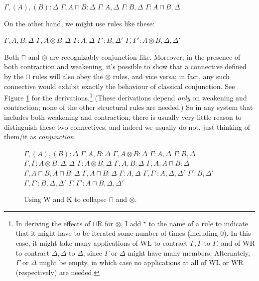 \documentclass{ergoclass}
\def\fCenter{:}
\newcommand{\mand}{\ensuremath{\otimes}}
\newcommand{\aand}{\ensuremath{\sqcap}}
\newcommand{\D}{\Delta}
\newcommand{\G}{\Gamma}
\newcommand{\hs}{\hskip 5mm}
\newcommand{\vs}{\vskip 5mm}
\newcommand{\BIx}[2]{\BinaryInf$ #1 \fCenter #2$}
\newcommand{\UIx}[2]{\UnaryInf$ #1 \fCenter #2$}
\newcommand{\AXx}[2]{\Axiom$ #1 \fCenter #2$}
\newcommand{\LLl}[1]{\LeftLabel{\scriptsize #1:\quad}}
\begin{document}
\medskip
{\centering
\AXx{\G, (A), (B)}{\D}
\LLl{$\aand$L}
\UIx{\G, A \aand B}{\D}
\DP
\hs
\AXx{\G}{A, \D}
\AXx{\G}{B, \D}
\LLl{$\aand$R}
\BIx{\G}{A \aand B, \D}
\DP

}
\medskip

\noindent On the other hand, we might use rules like these:


\medskip
{\centering
\AXx{\G, A, B}{\D}
\LLl{$\mand$L}
\UIx{\G, A \mand B}{\D}
\DP
\hs
\AXx{\G}{A, \D}
\AXx{\G'}{B, \D'}
\LLl{$\mand$R}
\BIx{\G, \G'}{A \mand B, \D, \D'}
\DP

}
\medskip

Both $\aand$ and $\mand$ are recognizably conjunction-like. Moreover, in the presence of both contraction and weakening, it's possible to show that a connective defined by the $\aand$ rules will also obey the $\mand$ rules, and vice versa; in fact, any such connective would exhibit exactly the behaviour of classical conjunction. See Figure \ref{interderiv} for the derivations.\footnote{In deriving the effects of $\aand$R for $\mand$, I add $^\star$ to the name of a rule to indicate that it might have to be iterated some number of times (including 0). In this case, it might take many applications of WL to contract $\G, \G$ to $\G$, and of WR to contract $\D, \D$ to $\D$, since $\G$ or $\D$ might have many members. Alternately, $\G$ or $\D$ might be empty, in which case no applications at all of WL or WR (respectively) are needed.} (These derivations depend {\em only} on weakening and contraction; none of the other structural rules are needed.) So in any system that includes both weakening and contraction, there is usually very little reason to distinguish these two connectives, and indeed we usually do not, just thinking of them/it as {\em conjunction}.

\begin{figure}


\begin{center}
\AXx{\G, (A), (B)}{\D}
\LLl{K}
\UIx{\G, A, B}{\D}
\LLl{$\mand$L}
\UIx{\G, A \mand B}{\D}
\DP
\hs
\AXx{\G}{A, \D}
\AXx{\G}{B, \D}
\LLl{$\mand$R}
\BIx{\G, \G}{A \mand B, \D, \D}
\LLl{WL$^\star$, WR$^\star$}
\UIx{\G}{A \mand B, \D}
\DP
\vs
\AXx{\G, A, B}{\D}
\LLl{$\aand$L}
\UIx{\G, A, A \aand B}{\D}
\LLl{$\aand$L}
\UIx{\G, A \aand B, A \aand B}{\D}
\LLl{WL}
\UIx{\G, A \aand B}{\D}
\DP
\hs
\AXx{\G}{A, \D}
\LLl{K}
\UIx{\G, \G'}{A, \D, \D'}
\AXx{\G'}{B, \D'}
\LLl{K}
\UIx{\G, \G'}{B, \D, \D'}
\LLl{$\aand$R}
\BIx{\G, \G'}{A \aand B, \D, \D'}
\DP

\end{center}


\caption{Using W and K to collapse $\aand$ and $\mand$.}
\label{interderiv}
\end{figure}
\end{document}
